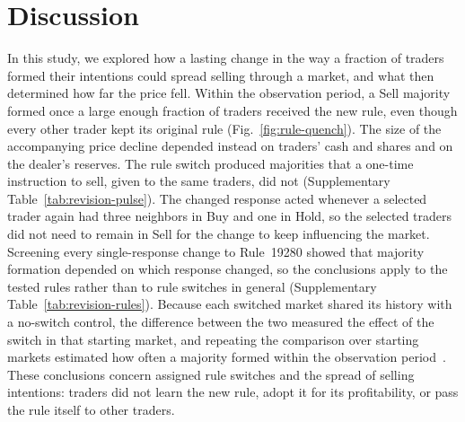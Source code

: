 \section{Discussion}

In this study, we explored how a lasting change in the way a fraction
of traders formed their intentions could spread selling through a market,
and what then determined how far the price fell. Within the observation
period, a Sell majority formed once a large enough fraction of traders
received the new rule, even though every other trader kept its original
rule (Fig.~\ref{fig:rule-quench}). The size of the accompanying price
decline depended instead on traders' cash and shares and on the dealer's
reserves. The rule switch produced majorities that a one-time
instruction to sell, given to the same traders, did not (Supplementary
Table~\ref{tab:revision-pulse}). The changed response acted whenever a
selected trader again had three neighbors in Buy and one in Hold, so the
selected traders did not need to remain in Sell for the change to keep
influencing the market. Screening every single-response change to
Rule~19280 showed that majority formation depended on which response
changed, so the conclusions apply to the tested rules rather than to
rule switches in general
(Supplementary Table~\ref{tab:revision-rules}). Because each switched
market shared its history with a no-switch control, the difference
between the two measured the effect of the switch in that starting
market, and repeating the comparison over starting markets estimated how
often a majority formed within the observation
period~\cite{glasserman1992guidelines,law2015simulation}. These
conclusions concern assigned rule switches and the spread of selling intentions:
traders did not learn the new rule, adopt it for its profitability, or
pass the rule itself to other traders.

